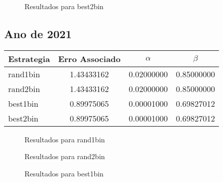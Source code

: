 \documentclass[]{article}
\begin{document}
\begin{figure}[h!]
	\centering
	
	
	\caption{Resultados para best2bin}
	\label{res04}
\end{figure}



\newpage

\subsection{Ano de 2021}

\begin{table}[h!]
	\centering
	\begin{tabular}{l c | c c}
		\toprule
		Estrategia & Erro Associado & $\alpha$ & $\beta$ \\
		\hline
		rand1bin & 1.43433162 & 0.02000000 & 0.85000000 \\
		rand2bin & 1.43433162 & 0.02000000 & 0.85000000 \\
		best1bin & 0.89975065 & 0.00001000 & 0.69827012 \\		
		best2bin & 0.89975065 & 0.00001000 & 0.69827012 \\		
		\bottomrule
	\end{tabular}
\end{table}

\begin{figure}[h!]
	\centering
	
	
	\caption{Resultados para rand1bin}
	\label{res05}
\end{figure}

\begin{figure}[h!]
	\centering
	
	
	\caption{Resultados para rand2bin}
	\label{res06}
\end{figure}

\begin{figure}[h!]
	\centering
	
	
	\caption{Resultados para best1bin}
	\label{res07}
\end{figure}
\end{document}
